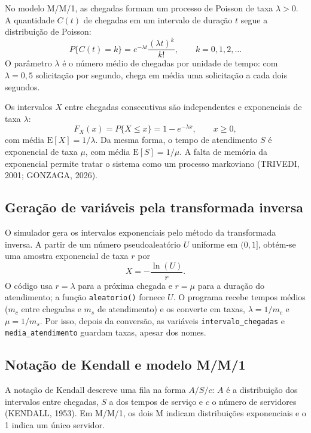 \documentclass[
  article,      %
  10pt,         %
  oneside,
  a4paper,
  twocolumn,    %
  english,
  brazil        %
]{abntex2}
\begin{document}
No modelo M/M/1, as chegadas formam um processo de Poisson de taxa $\lambda>0$. A quantidade $C(t)$ de chegadas em um intervalo de duração $t$ segue a distribuição de Poisson:
\begin{equation}
  P\{C(t)=k\}=e^{-\lambda t}\frac{(\lambda t)^k}{k!},
  \qquad k=0,1,2,\ldots
  \label{eq:poisson}
\end{equation}
O parâmetro $\lambda$ é o número médio de chegadas por unidade de tempo: com $\lambda=0{,}5$ solicitação por segundo, chega em média uma solicitação a cada dois segundos.

Os intervalos $X$ entre chegadas consecutivas são independentes e exponenciais de taxa $\lambda$:
\begin{equation}
  F_X(x)=P\{X\leq x\}=1-e^{-\lambda x},
  \qquad x\geq 0,
  \label{eq:exponencial-chegada}
\end{equation}
com média $\mathrm{E}[X]=1/\lambda$. Da mesma forma, o tempo de atendimento $S$ é exponencial de taxa $\mu$, com média $\mathrm{E}[S]=1/\mu$. A falta de memória da exponencial permite tratar o sistema como um processo markoviano (TRIVEDI, 2001; GONZAGA, 2026).

\subsection{Geração de variáveis pela transformada inversa}

O simulador gera os intervalos exponenciais pelo método da transformada inversa. A partir de um número pseudoaleatório $U$ uniforme em $(0,1]$, obtém-se uma amostra exponencial de taxa $r$ por
\begin{equation}
  X=-\frac{\ln(U)}{r}.
  \label{eq:transformada-inversa}
\end{equation}
O código usa $r=\lambda$ para a próxima chegada e $r=\mu$ para a duração do atendimento; a função \texttt{aleatorio()} fornece $U$. O programa recebe tempos médios ($m_c$ entre chegadas e $m_s$ de atendimento) e os converte em taxas, $\lambda=1/m_c$ e $\mu=1/m_s$. Por isso, depois da conversão, as variáveis \texttt{intervalo\_chegadas} e \texttt{media\_atendimento} guardam taxas, apesar dos nomes.

\subsection{Notação de Kendall e modelo M/M/1}

A notação de Kendall descreve uma fila na forma $A/S/c$: $A$ é a distribuição dos intervalos entre chegadas, $S$ a dos tempos de serviço e $c$ o número de servidores (KENDALL, 1953). Em M/M/1, os dois M indicam distribuições exponenciais e o 1 indica um único servidor.
\end{document}
